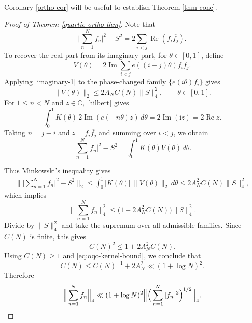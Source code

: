 \documentclass{amsart}
\numberwithin{equation}{section}
\begin{document}
Corollary \ref{ortho-cor} will be useful to establish Theorem \ref{thm-cone}.

\bigskip 

\begin{proof}[Proof of Theorem \ref{quartic-ortho-thm}]

Note that
\[
    \Big|\sum_{n=1}^N f_n\Big|^2-S^2=2\sum_{i<j}\operatorname{Re}(f_i\overline{f_j}).
\]
To recover the real part from its imaginary part, for $\theta\in[0,1]$, define
\begin{equation*}
    V(\theta)=2\operatorname{Im}\sum_{i<j}
    e((i-j)\theta)f_i\overline{f_j}.
\end{equation*}
Applying \eqref{imaginary-1} to the phase-changed family $\{e(i\theta)f_i\}$ gives
\begin{equation*}
    \|V(\theta)\|_2\le2A_N C(N)\|S\|_4^2,
    \qquad \theta\in[0,1].
\end{equation*}
For $1\le n<N$ and $z\in\mathbb{C}$,
\eqref{hilbert} gives
\begin{equation*}
\int_0^{1}K(\theta)\,
    2\operatorname{Im}(e(-n\theta)z)\,d\theta
    =2\operatorname{Im}(\mathrm{i}z)=2\operatorname{Re}z.
\end{equation*}
Taking $n=j-i$ and $z=f_i\overline{f_j}$ and summing over $i<j$, we obtain
\begin{equation*}
    \Big|\sum_{n=1}^N f_n\Big|^2-S^2
    =\int_0^{1}K(\theta)V(\theta)\,d\theta.
\end{equation*}

Thus Minkowski's inequality gives
\begin{align*}
    \Big\|\Big|\sum_{n=1}^N f_n\Big|^2-S^2\Big\|_2
    \le\int_0^{1}|K(\theta)|\,
    \|V(\theta)\|_2\,d\theta\le2A_N^2 C(N)\|S\|_4^2,
\end{align*} 
which implies
\begin{equation*}
    \Big\|\sum_{n=1}^N f_n\Big\|_4^2
    \le\bigl(1+2A_N^2 C(N)\bigr)\|S\|_4^2.
\end{equation*}
Divide by $\|S\|_4^2$ and take the supremum over all admissible families. 
Since $C(N)$ is finite, this gives
\begin{equation*}
    C(N)^2\le1+2A_N^2 C(N).
\end{equation*}
Using $C(N)\ge1$ and \eqref{eq:oqo-kernel-bound}, we conclude that
\begin{equation*}
    C(N)\le C(N)^{-1}+2A_N^2
    \ll(1+\log N)^2.
\end{equation*}
Therefore
\begin{equation*}
    \Big\|\sum_{n=1}^N f_n\Big\|_4
    \ll(1+\log N)^2
    \Big\|\Big(\sum_{n=1}^N|f_n|^2\Big)^{1/2}\Big\|_4.
    \qedhere
\end{equation*}
\end{proof}
\end{document}
